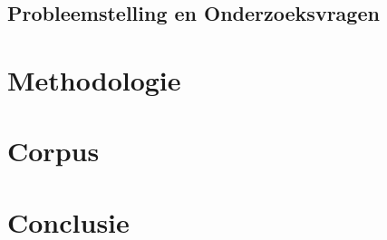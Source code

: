 \documentclass[pdftex,a4paper,12pt,twoside]{report}
\begin{document}
\section{Probleemstelling en Onderzoeksvragen}
\label{sec:onderzoeksvragen}

\lipsum[7-20]

\chapter{Methodologie}
\label{ch:methodologie}

\lipsum[21-25]

\chapter{Corpus}
\label{ch:corpus}

\lipsum[26-75]

\chapter{Conclusie}
\label{ch:conclusie}

\lipsum[76-80]






\listoffigures
\listoftables
\end{document}
